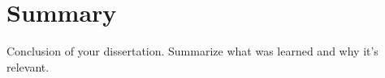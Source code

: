 \chapter{Summary}

Conclusion of your dissertation. Summarize what was learned and why it's
relevant.

